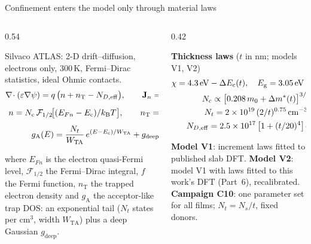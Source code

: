 \begin{frame}[t]{Confinement enters the model only through material laws}
  \fourTop
  \begin{columns}[T,onlytextwidth]
    \begin{column}{0.54\textwidth}
      {\small\fourEqSkip Silvaco ATLAS\fourAtlas: 2-D drift--diffusion, electrons only, 300\,K, Fermi--Dirac statistics,
        ideal Ohmic contacts.
      \begin{gather*}
        \nabla\!\cdot(\varepsilon\nabla\psi) = q\,\big(n + n_\mathrm{T} - N_{D,\mathrm{eff}}\big), \qquad
        \mathbf{J}_n = \mu\, n\,\nabla E_{Fn}\\
        n = N_{\mathrm{c}}\,\mathcal{F}_{1/2}\!\big[(E_{Fn}-E_{\mathrm{c}})/k_{\mathrm{B}}T\big], \qquad n_\mathrm{T} = \!\int\! g_\mathrm{A} f\,dE\\
        g_\mathrm{A}(E) = \frac{N_t}{W_\mathrm{TA}}\,e^{(E-E_{\mathrm{c}})/W_\mathrm{TA}} + g_\mathrm{deep}(E)
      \end{gather*}\par}
      {\footnotesize where $E_{Fn}$ is the electron quasi-Fermi level, $\mathcal{F}_{1/2}$ the Fermi--Dirac integral,
        $f$ the Fermi function, $n_\mathrm{T}$ the trapped electron density and $g_\mathrm{A}$ the acceptor-like trap
        DOS: an exponential tail ($N_t$ states per cm$^3$, width $W_\mathrm{TA}$) plus a deep Gaussian
        $g_\mathrm{deep}$.\par}
    \end{column}
    \begin{column}{0.42\textwidth}
      {\small\fourEqSkip\textbf{Thickness laws} ($t$ in nm; models V1, V2)
      \begin{gather*}
        \chi = 4.3\,\mathrm{eV} - \Delta E_{\mathrm{c}}(t), \quad E_{\mathrm{g}} = 3.05\,\mathrm{eV} + \Delta E_{\mathrm{g}}(t)\\
        N_{\mathrm{c}} \propto \big[0.208\,m_0 + \Delta m^{*}(t)\big]^{3/2}\\
        N_t = 2\times10^{19}\,(2/t)^{0.75}\,\mathrm{cm^{-3}}\\
        N_{D,\mathrm{eff}} = 2.5\times10^{17}\,\big[1 + (t/20)^{4}\big]\,\mathrm{cm^{-3}}
      \end{gather*}\par}
      {\footnotesize\textbf{Model V1}: increment laws fitted to published slab DFT. \textbf{Model V2}: model V1 with laws
        fitted to this work's DFT (Part~6), recalibrated. \textbf{Campaign C10}: one parameter set for all films;
        $N_t = N_s/t$, fixed donors.\par}
    \end{column}
  \end{columns}
\end{frame}

